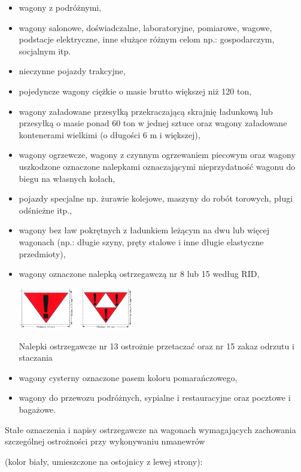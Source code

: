\begin{itemize}
\item wagony z podróżnymi,
\item wagony salonowe, doświadczalne, laboratoryjne, pomiarowe, wagowe, podstacje elektryczne, inne służące różnym celom np.:
gospodarczym, socjalnym itp.
\item 
nieczynne pojazdy trakcyjne,
\item 
pojedyncze wagony ciężkie o masie brutto większej niż 120 ton,
\item wagony załadowane przesyłką przekraczającą skrajnię ładunkową lub przesyłką o masie ponad 60 ton w jednej sztuce oraz
wagony załadowane kontenerami wielkimi (o długości 6 m i większej),
\item wagony ogrzewcze, wagony z czynnym ogrzewaniem piecowym oraz wagony uszkodzone oznaczone nalepkami oznaczającymi
nieprzydatność wagonu do biegu na własnych kołach,
\item pojazdy specjalne np. żurawie kolejowe, maszyny do robót torowych, pługi odśnieżne itp.,
\item wagony bez ław pokrętnych z ładunkiem leżącym na dwu lub więcej wagonach (np.: długie szyny, pręty stalowe i inne długie
elastyczne przedmioty), 
\item wagony oznaczone nalepką ostrzegawczą nr 8 lub 15 według RID,
\begin{marginfigure}
	\includegraphics[width=5cm]{skryptkierownik-img/znaki-manewrowania.png}
	\caption{Nalepki ostrzegawcze nr 13 ostrożnie przetaczać oraz nr 15 zakaz odrzutu i staczania} 
	\end{marginfigure}
\item wagony cysterny oznaczone pasem koloru pomarańczowego, 
\item wagony do przewozu podróżnych, sypialne i restauracyjne oraz pocztowe i bagażowe.
\end{itemize}
Stałe oznaczenia i napisy ostrzegawcze na wagonach wymagających zachowania szczególnej ostrożności przy wykonywaniu nmanewrów

(kolor biały, umieszczone na ostojnicy z lewej strony):

